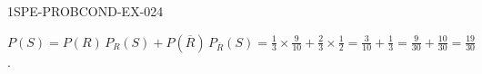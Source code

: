 \begin{corrige}{1SPE-PROBCOND-EX-024}

$P(S) = P(R)\,P_R(S) + P(\overline{R})\,P_{\overline{R}}(S) = \frac{1}{3}\times\frac{9}{10} + \frac{2}{3}\times\frac{1}{2} = \frac{3}{10}+\frac{1}{3} = \frac{9}{30}+\frac{10}{30} = \frac{19}{30}$.

\end{corrige}
